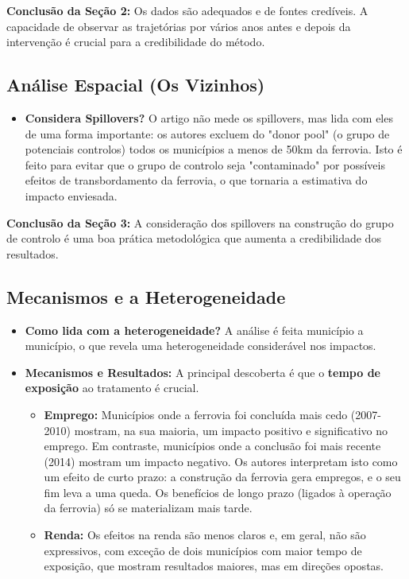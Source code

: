 \documentclass[12pt, a4paper]{article}
\begin{document}
\noindent\textbf{Conclusão da Seção 2:} Os dados são adequados e de fontes credíveis. A capacidade de observar as trajetórias por vários anos antes e depois da intervenção é crucial para a credibilidade do método.

\subsection{Análise Espacial (Os Vizinhos)}

\begin{itemize}
    \item \textbf{Considera Spillovers?} O artigo não mede os spillovers, mas lida com eles de uma forma importante: os autores excluem do "donor pool" (o grupo de potenciais controlos) todos os municípios a menos de 50km da ferrovia. Isto é feito para evitar que o grupo de controlo seja "contaminado" por possíveis efeitos de transbordamento da ferrovia, o que tornaria a estimativa do impacto enviesada.
\end{itemize}

\noindent\textbf{Conclusão da Seção 3:} A consideração dos spillovers na construção do grupo de controlo é uma boa prática metodológica que aumenta a credibilidade dos resultados.

\subsection{Mecanismos e a Heterogeneidade}

\begin{itemize}
    \item \textbf{Como lida com a heterogeneidade?} A análise é feita município a município, o que revela uma heterogeneidade considerável nos impactos.
    \item \textbf{Mecanismos e Resultados:} A principal descoberta é que o \textbf{tempo de exposição} ao tratamento é crucial.
        \begin{itemize}
            \item \textbf{Emprego:} Municípios onde a ferrovia foi concluída mais cedo (2007-2010) mostram, na sua maioria, um impacto positivo e significativo no emprego. Em contraste, municípios onde a conclusão foi mais recente (2014) mostram um impacto negativo. Os autores interpretam isto como um efeito de curto prazo: a construção da ferrovia gera empregos, e o seu fim leva a uma queda. Os benefícios de longo prazo (ligados à operação da ferrovia) só se materializam mais tarde.
            \item \textbf{Renda:} Os efeitos na renda são menos claros e, em geral, não são expressivos, com exceção de dois municípios com maior tempo de exposição, que mostram resultados maiores, mas em direções opostas.
        \end{itemize}
\end{itemize}
\end{document}
